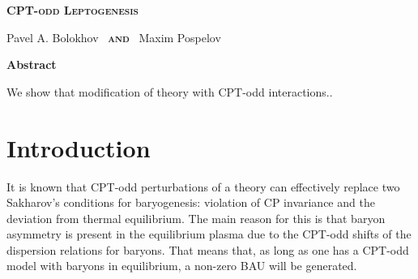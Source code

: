 \documentclass[12pt]{revtex4}
\begin{document}
\begin{titlepage}
\renewcommand{\thefootnote}{\fnsymbol{footnote}}

\vspace*{3.0cm}
\begin{center}
{\Large
  \textbf{
  \textsc{CPT-odd Leptogenesis}
         }
      }

\vspace*{1.0cm}
  {\large {}\selectfont Pavel A. Bolokhov~ 
        {\normalsize\bf \textsc{and}} ~Maxim Pospelov}

\vspace*{1.5cm}
{\large\bf Abstract}
\end{center}

        We show that modification of theory with CPT-odd interactions..

\end{titlepage}

%
%
\section{Introduction}

%
%
%
%
%
%


	It is known that CPT-odd perturbations of a theory can effectively
	replace two Sakharov's conditions for baryogenesis: violation of CP
	invariance and the deviation from thermal equilibrium.
	The main reason for this is that baryon asymmetry is present in the
	equilibrium plasma due to the CPT-odd shifts of the dispersion relations
	for baryons.
	That means that, as long as one has a CPT-odd model with baryons in equilibrium,
	a non-zero BAU will be generated.
	
\end{document}
